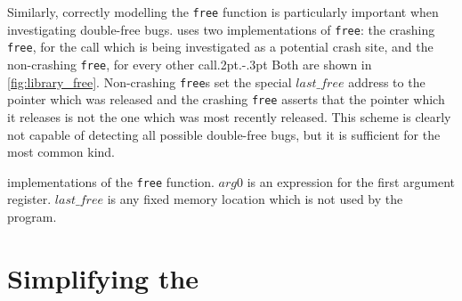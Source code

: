 Similarly, correctly modelling the \texttt{free} function is
particularly important when investigating double-free bugs.
{\Technique} uses two implementations of \texttt{free}: the crashing
\texttt{free}, for the call which is being investigated as a potential
crash site, and the non-crashing \texttt{free}, for every other
call\kern.2pt.\kern-.3pt  Both are shown in
\autoref{fig:library_free}.  Non-crashing \texttt{free}s set the
special $\mathit{last\_free}$ address to the pointer which was
released and the crashing \texttt{free} asserts that the pointer which
it releases is not the one which was most recently released.  This
scheme is clearly not capable of detecting all possible double-free
bugs, but it is sufficient for the most common kind.

\begin{sanefig}
  \centerline{
  }
  \vspace{-12pt}
  \caption{{\STateMachine} implementations of the {\tt free}
    function. $\mathit{arg0}$ is an expression for the first argument
    register.  $\mathit{last\_free}$ is any fixed memory location
    which is not used by the program.}
  \label{fig:library_free}
\end{sanefig}

\section{Simplifying the {\StateMachine}}
\label{sect:derive:simplify_sm}

